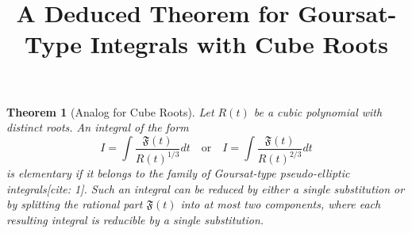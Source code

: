\documentclass{article}
\title{\textbf{A Deduced Theorem for Goursat-Type Integrals with Cube Roots}}
\author{}
\date{}
\theoremstyle{plain}
\newtheorem{theorem}{Theorem}
\newcommand{\Fcal}{\mathfrak{F}}
\begin{document}
\maketitle

\begin{theorem}[Analog for Cube Roots]
Let $R(t)$ be a cubic polynomial with distinct roots. An integral of the form 
$$ I = \int \frac{\Fcal(t)}{R(t)^{1/3}} dt \quad \text{or} \quad I = \int \frac{\Fcal(t)}{R(t)^{2/3}} dt $$
is elementary if it belongs to the family of Goursat-type pseudo-elliptic integrals[cite: 1]. Such an integral can be reduced by either a single substitution or by splitting the rational part $\Fcal(t)$ into at most two components, where each resulting integral is reducible by a single substitution.
\end{theorem}
\end{document}
